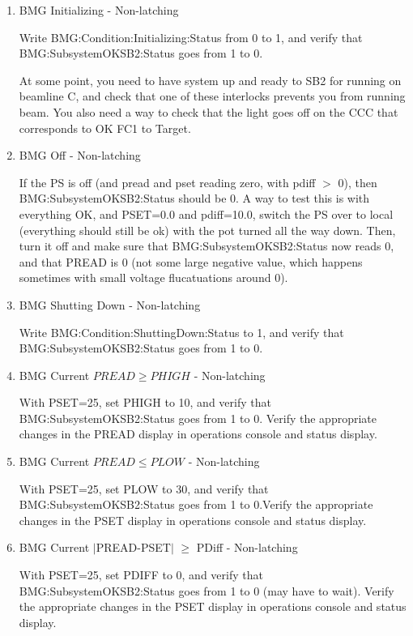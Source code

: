 \documentclass[11pt]{book}		%
\begin{document}
\begin{enumerate}
 \item BMG Initializing - Non-latching

\color{red}
Write BMG:Condition:Initializing:Status from 0 to 1, and verify that BMG:SubsystemOKSB2:Status goes from 1 to 0.

At some point, you need to have system up and ready to SB2 for running on beamline C, and check that one of these interlocks prevents you from running beam. You also need a way to check that the light goes off on the CCC that corresponds to OK FC1 to Target.
\color{black}

 \item BMG Off - Non-latching

\color{red}
If the PS is off (and pread and pset reading zero, with pdiff $>$ 0), then BMG:SubsystemOKSB2:Status should be 0. A way to test this is with everything OK, and PSET=0.0 and pdiff=10.0, switch the PS over to local (everything should still be ok) with the pot turned all the way down. Then, turn it off and make sure that BMG:SubsystemOKSB2:Status now reads 0, and that PREAD is 0 (not some large negative value, which happens sometimes with small voltage flucatuations around 0).
\color{black}

 \item BMG Shutting Down - Non-latching

\color{red}
Write BMG:Condition:ShuttingDown:Status to 1, and verify that BMG:SubsystemOKSB2:Status goes from 1 to 0.
\color{black}

 \item BMG Current $PREAD \geq PHIGH$ - Non-latching

\color{red}
With PSET=25, set PHIGH to 10, and verify that BMG:SubsystemOKSB2:Status goes from 1 to 0. Verify the appropriate changes in the PREAD display in operations console and status display.
\color{black}

 \item BMG Current $PREAD \leq PLOW$ - Non-latching

\color{red}
With PSET=25, set PLOW to 30, and verify that BMG:SubsystemOKSB2:Status goes from 1 to 0.Verify the appropriate changes in the PSET display in operations console and status display.
\color{black}

 \item BMG Current $\mid$PREAD-PSET$\mid$  $\geq$ PDiff - Non-latching

\color{red}
With PSET=25, set PDIFF to 0, and verify that BMG:SubsystemOKSB2:Status goes from 1 to 0 (may have to wait). Verify the appropriate changes in the PSET display in operations console and status display.
\color{black}


\end{enumerate}
\end{document}
